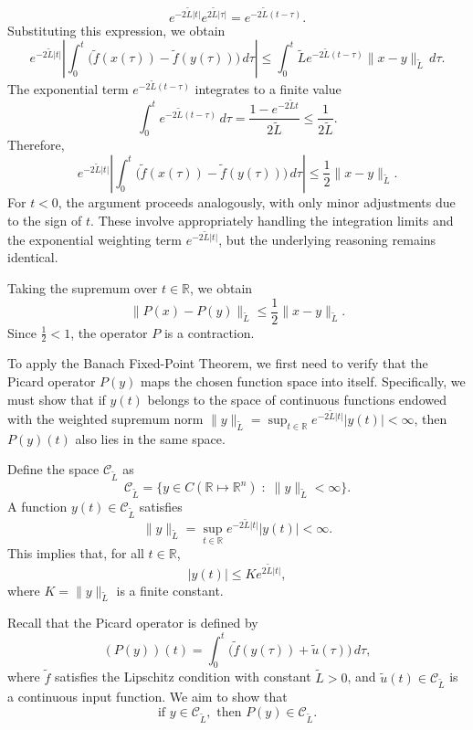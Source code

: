 \documentclass[preprint,12pt]{elsarticle}
\begin{document}
\begin{pf}
\[
e^{-2\tilde L |t|} e^{2\tilde L |\tau|} = e^{-2\tilde L (t - \tau)}.
\]
Substituting this expression, we obtain 
\[
e^{-2\tilde L |t|} \left| \int_0^t \big(\tilde f(x(\tau)) - \tilde f(y(\tau))\big) \, d\tau \right| 
\leq \int_0^t \tilde L e^{-2\tilde L (t - \tau)} \|x - y\|_{\tilde L} \, d\tau.
\]
The exponential term \( e^{-2\tilde L (t - \tau)} \) integrates to a finite value 
\[
\int_0^t e^{-2\tilde L (t - \tau)} \, d\tau = \frac{1 - e^{-2\tilde L t}}{2\tilde L} \leq \frac{1}{2\tilde L}.
\]
Therefore,
\[
e^{-2\tilde L |t|} \left| \int_0^t \big(\tilde f(x(\tau)) - \tilde f(y(\tau))\big) \, d\tau \right| 
\leq  \frac{1}{2} \|x - y\|_{\tilde L}.
\]
For \( t < 0 \), the argument proceeds analogously, with only minor adjustments due to the sign of \( t \). These involve appropriately handling the integration limits and the exponential weighting term \( e^{-2\tilde L |t|} \), but the underlying reasoning remains identical.

Taking the supremum over \( t \in \mathbb{R} \), we obtain
\[
\|P(x)- P(y)\|_{\tilde L} \leq \frac{1}{2} \|x - y\|_{\tilde L}.
\]
Since \( \frac{1}{2} < 1 \), the operator \( P \) is a contraction. 

To apply the Banach Fixed-Point Theorem, we first need to verify that the Picard operator \( P(y) \) maps the chosen function space into itself. Specifically, we must show that if \( y(t) \) belongs to the space of continuous functions endowed with the weighted supremum norm \( \|y\|_{\tilde L} = \sup_{t \in \mathbb{R}} e^{-2\tilde L |t|} |y(t)| < \infty \), then \( P(y)(t) \) also lies in the same space.

Define the space \( \mathcal{C}_{\tilde L} \) as
   \[
   \mathcal{C}_{\tilde L} = \{ y \in C(\mathbb{R} \mapsto \mathbb{R}^n) \; : \; \|y\|_{\tilde L} < \infty \}.
   \]
A function \( y(t) \in \mathcal{C}_{\tilde{L}} \) satisfies
\[
\|y\|_{\tilde{L}} = \sup_{t \in \mathbb{R}} e^{-2\tilde{L} |t|} |y(t)| < \infty.
\]
This implies that, for all \( t \in \mathbb{R} \),
\[
|y(t)| \leq K e^{2\tilde{L}|t|},
\]
where \( K = \|y\|_{\tilde{L}} \) is a finite constant.

Recall that the Picard operator is defined by
\[
(P(y))(t) = \int_0^t \big(\tilde{f}(y(\tau)) + \tilde u(\tau)\big) \, d\tau,
\]
where \( \tilde{f} \) satisfies the Lipschitz condition with constant \( \tilde{L} > 0 \), and \( \tilde u(t) \in \mathcal{C}_{\tilde L} \) is a continuous input function.  
We aim to show that
\[
\text{if } y \in \mathcal{C}_{\tilde L}, \text{ then } P(y) \in \mathcal{C}_{\tilde L}.
\]


\end{pf}
\end{document}

